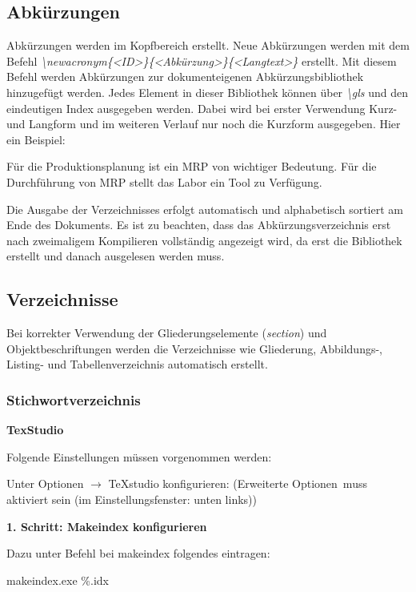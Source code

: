 \documentclass[13pt,a4paper, listof=entryprefix, bibliography=totocnumbered,toc=listofnumbered,lof=listofnumbered]{scrartcl}
\newcounter{verzeichnis}
\begin{document}
\subsection{Abkürzungen}
\label{ch:abkuerzung}
Abkürzungen werden im  Kopfbereich erstellt. Neue Abkürzungen werden mit dem Befehl
\textit{\textbackslash newacronym\{\textless ID\textgreater\}\{\textless Abkürzung\textgreater\}\{\textless Langtext\textgreater\}} erstellt. Mit diesem Befehl werden Abkürzungen zur dokumenteigenen Abkürzungsbibliothek hinzugefügt werden. Jedes Element in dieser Bibliothek können über \textit{\textbackslash gls} und den eindeutigen Index ausgegeben werden. Dabei wird bei erster Verwendung Kurz- und Langform und im weiteren Verlauf nur noch die Kurzform ausgegeben. Hier ein Beispiel:

Für die Produktionsplanung ist ein \gls{MRP} von wichtiger Bedeutung. Für die Durchführung von \gls{MRP} stellt das Labor ein Tool zu Verfügung.

Die Ausgabe der Verzeichnisses erfolgt automatisch und alphabetisch sortiert am Ende des Dokuments. Es ist zu beachten, dass das Abkürzungsverzeichnis erst nach zweimaligem Kompilieren vollständig angezeigt wird, da erst die Bibliothek erstellt und danach ausgelesen werden muss.

\subsection{Verzeichnisse}
\label{ch:verzeichnisse}
Bei korrekter Verwendung der Gliederungselemente (\textit{section}) und Objektbeschriftungen werden die Verzeichnisse wie Gliederung, Abbildungs-, Listing- und Tabellenverzeichnis automatisch erstellt.

\subsubsection{Stichwortverzeichnis}

\textbf{TexStudio}

Folgende Einstellungen müssen vorgenommen werden:

Unter Optionen $\rightarrow$ TeXstudio konfigurieren:
(\glqq Erweiterte Optionen\grqq \ muss aktiviert sein (im Einstellungsfenster: unten links))

\textbf{1. Schritt: Makeindex konfigurieren}

Dazu unter Befehl bei makeindex folgendes eintragen:

makeindex.exe \%.idx
\end{document}
